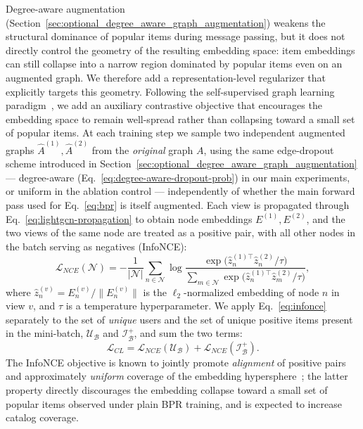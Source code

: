 Degree-aware augmentation (Section~\ref{sec:optional_degree_aware_graph_augmentation})
weakens the structural dominance of popular items during message passing, but it does not
directly control the geometry of the resulting embedding space: item embeddings can still
collapse into a narrow region dominated by popular items even on an augmented graph. We
therefore add a representation-level regularizer that explicitly targets this geometry.
Following the self-supervised graph learning paradigm~\cite{wu2021sgl}, we add an auxiliary
contrastive objective that encourages the embedding space to remain well-spread rather than
collapsing toward a small set of popular items. At each training step we sample two
independent augmented graphs $\hat{A}^{(1)}, \hat{A}^{(2)}$ from the \emph{original} graph
$A$, using the same edge-dropout scheme introduced in
Section~\ref{sec:optional_degree_aware_graph_augmentation} --- degree-aware
(Eq.~\eqref{eq:degree-aware-dropout-prob}) in our main experiments, or uniform in the
ablation control --- independently of whether the main forward pass used for
Eq.~\eqref{eq:bpr} is itself augmented. Each view is propagated through
Eq.~\eqref{eq:lightgcn-propagation} to obtain node embeddings $E^{(1)}, E^{(2)}$, and the two
views of the same node are treated as a positive pair, with all other nodes in the batch
serving as negatives (InfoNCE):
\begin{equation}
    \mathcal{L}_{NCE}(\mathcal{N}) = -\frac{1}{|\mathcal{N}|}\sum_{n\in\mathcal{N}}
    \log \frac{\exp\!\big(\hat{z}_n^{(1)\top}\hat{z}_n^{(2)}/\tau\big)}
    {\sum_{m\in\mathcal{N}} \exp\!\big(\hat{z}_n^{(1)\top}\hat{z}_m^{(2)}/\tau\big)},
    \label{eq:infonce}
\end{equation}
where $\hat{z}_n^{(v)} = E^{(v)}_n / \lVert E^{(v)}_n \rVert$ is the $\ell_2$-normalized
embedding of node $n$ in view $v$, and $\tau$ is a temperature hyperparameter. We apply
Eq.~\eqref{eq:infonce} separately to the set of \emph{unique} users and the set of unique
positive items present in the mini-batch, $\mathcal{U}_{\mathcal{B}}$ and
$\mathcal{I}^{+}_{\mathcal{B}}$, and sum the two terms:
\begin{equation}
    \mathcal{L}_{CL} = \mathcal{L}_{NCE}(\mathcal{U}_{\mathcal{B}})
                      + \mathcal{L}_{NCE}(\mathcal{I}^{+}_{\mathcal{B}}).
\end{equation}
The InfoNCE objective is known to jointly promote \emph{alignment} of positive pairs and
approximately \emph{uniform} coverage of the embedding hypersphere~\cite{wang2020alignuniform};
the latter property directly discourages the embedding collapse toward a small set of popular
items observed under plain BPR training, and is expected to increase catalog coverage.

